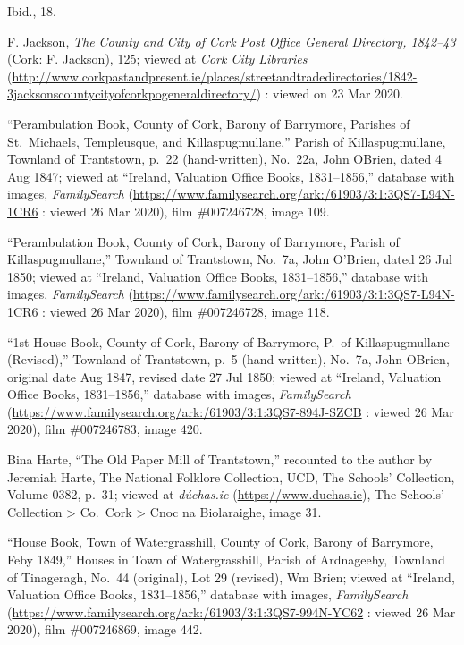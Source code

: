 \begin{thebibliography}{99}
	Ibid., 18.
	
	F. Jackson, \textit{The County and City of Cork Post Office General Directory, 1842--43} (Cork: F. Jackson), 125; viewed at \textit{Cork City Libraries} (\url{http://www.corkpastandpresent.ie/places/streetandtradedirectories/1842-3jacksonscountycityofcorkpogeneraldirectory/}) : viewed on 23 Mar 2020.
	
	``Perambulation Book, County of Cork, Barony of Barrymore, Parishes of St.\ Michaels, Templeusque, and Killaspugmullane,'' Parish of Killaspugmullane, Townland of Trantstown, p.\ 22 (hand-written), No.\ 22a, John OBrien, dated 4 Aug 1847; viewed at ``Ireland, Valuation Office Books, 1831--1856,'' database with images, \textit{FamilySearch} (\url{https://www.familysearch.org/ark:/61903/3:1:3QS7-L94N-1CR6} : viewed 26 Mar 2020), film \#007246728, image 109.
	
	``Perambulation Book, County of Cork, Barony of Barrymore, Parish of Killaspugmullane,'' Townland of Trantstown, No.\ 7a, John O'Brien, dated 26 Jul 1850; viewed at ``Ireland, Valuation Office Books, 1831--1856,'' database with images, \textit{FamilySearch} (\url{https://www.familysearch.org/ark:/61903/3:1:3QS7-L94N-1CR6} : viewed 26 Mar 2020), film \#007246728, image 118.
	
	``1st House Book, County of Cork, Barony of Barrymore, P.\ of Killaspugmullane (Revised),'' Townland of Trantstown, p.\ 5 (hand-written), No.\ 7a, John OBrien, original date Aug 1847, revised date 27 Jul 1850; viewed at ``Ireland, Valuation Office Books, 1831--1856,'' database with images, \textit{FamilySearch} (\url{https://www.familysearch.org/ark:/61903/3:1:3QS7-894J-SZCB} : viewed 26 Mar 2020), film \#007246783, image 420.
		
	Bina Harte, ``The Old Paper Mill of Trantstown,'' recounted to the author by Jeremiah Harte, The National Folklore Collection, UCD, The Schools' Collection, Volume 0382, p.\ 31; viewed at \textit{d\'{u}chas.ie} (\url{https://www.duchas.ie}), The Schools' Collection > Co.\ Cork > Cnoc na Biolaraighe, image 31.
	
	``House Book, Town of Watergrasshill, County of Cork, Barony of Barrymore, Feby 1849,'' Houses in Town of Watergrasshill, Parish of Ardnageehy, Townland of Tinageragh, No.\ 44 (original), Lot 29 (revised), Wm Brien; viewed at ``Ireland, Valuation Office Books, 1831--1856,'' database with images, \textit{FamilySearch} (\url{https://www.familysearch.org/ark:/61903/3:1:3QS7-994N-YC62} : viewed 26 Mar 2020), film \#007246869, image 442.
	

\end{thebibliography}

